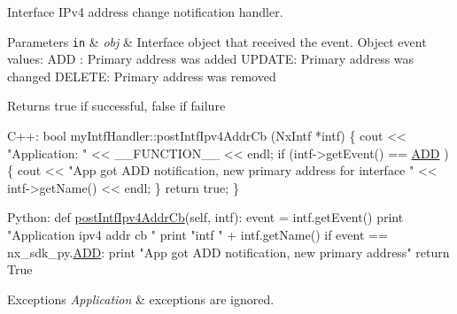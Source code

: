 Interface I\+Pv4 address change notification handler. 
\begin{DoxyParams}[1]{Parameters}
\mbox{\tt in}  & {\em obj} & Interface object that received the event. Object event values\+: A\+DD \+: Primary address was added U\+P\+D\+A\+TE\+: Primary address was changed D\+E\+L\+E\+TE\+: Primary address was removed \\
\hline
\end{DoxyParams}
\begin{DoxyReturn}{Returns}
true if successful, false if failure
\end{DoxyReturn}

\begin{DoxyCode}
C++:
   \textcolor{keywordtype}{bool}  myIntfHandler::postIntfIpv4AddrCb (NxIntf *intf)
   \{
     cout << \textcolor{stringliteral}{"Application: "} << \_\_FUNCTION\_\_ << endl;
     \textcolor{keywordflow}{if} (intf->getEvent() == \mbox{\hyperlink{nx__common_8h_af9a9040b7681199d386e94eb888018cba93d8c810253e44a0fd5f3d8d26032ad5}{ADD}} ) \{
        cout << \textcolor{stringliteral}{"App got ADD notification, new primary address for }
\textcolor{stringliteral}{                  interface  "} <<      intf->getName() << endl;
     \}
     \textcolor{keywordflow}{return} \textcolor{keyword}{true};
   \}

Python:
   def \mbox{\hyperlink{classnxos_1_1_nx_intf_mgr_handler_a8f96e0a3a70f5f566b8f0f5928bf5e64}{postIntfIpv4AddrCb}}(\textcolor{keyword}{self}, intf):
      event = intf.getEvent()
      print \textcolor{stringliteral}{"Application ipv4 addr cb "}
      print \textcolor{stringliteral}{"intf "} + intf.getName()
      if event == nx\_sdk\_py.\mbox{\hyperlink{nx__common_8h_af9a9040b7681199d386e94eb888018cba93d8c810253e44a0fd5f3d8d26032ad5}{ADD}}:
         print \textcolor{stringliteral}{"App got ADD notification, new primary address"}
      return True
\end{DoxyCode}



\begin{DoxyExceptions}{Exceptions}
{\em Application} & exceptions are ignored. \\
\hline
\end{DoxyExceptions}
\mbox{\label{classnxos_1_1_nx_intf_mgr_handler_ad845ed26b457bc0bdc7a9c79a94acdaf}} 
